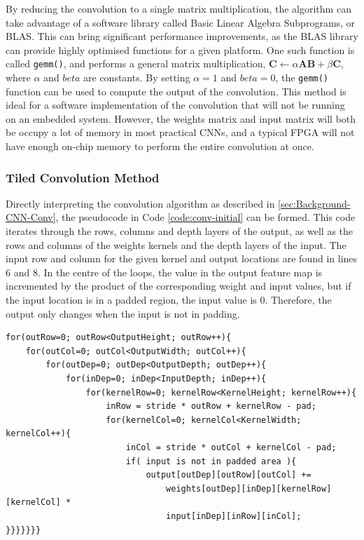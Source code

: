 \documentclass[12pt]{article}
\begin{document}
By reducing the convolution to a single matrix multiplication, the algorithm can take advantage of a software library called Basic Linear Algebra Subprograms, or BLAS. This can bring significant performance improvements, as the BLAS library can provide highly optimised functions for a given platform. One such function is called \lstinline|gemm()|, and performs a general matrix multiplication, $\mathbf{C} \gets \alpha\mathbf{A}\mathbf{B} + \beta\mathbf{C}$, where $\alpha$ and $beta$ are constants. By setting $\alpha = 1$ and $beta = 0$, the \lstinline|gemm()| function can be used to compute the output of the convolution. This method is ideal for a software implementation of the convolution that will not be running on an embedded system. However, the weights matrix and input matrix will both be occupy a lot of memory in most practical CNNs, and a typical FPGA will not have enough on-chip memory to perform the entire convolution at once.

\subsubsection{Tiled Convolution Method}
\label{sec:Imp-Conv-PC}

Directly interpreting the convolution algorithm as described in \ref{sec:Background-CNN-Conv}, the pseudocode in Code \ref{code:conv-initial} can be formed. This code iterates through the rows, columns and depth layers of the output, as well as the rows and columns of the weights kernels and the depth layers of the input. The input row and column for the given kernel and output locations are found in lines 6 and 8. In the centre of the loops, the value in the output feature map is incremented by the product of the corresponding weight and input values, but if the input location is in a padded region, the input value is 0. Therefore, the output only changes when the input is not in padding.

\renewcommand{\lstlistingname}{Code}
\begin{lstlisting}[caption=Basic Convolution, label=code:conv-initial]
for(outRow=0; outRow<OutputHeight; outRow++){
	for(outCol=0; outCol<OutputWidth; outCol++){
		for(outDep=0; outDep<OutputDepth; outDep++){
			for(inDep=0; inDep<InputDepth; inDep++){      
				for(kernelRow=0; kernelRow<KernelHeight; kernelRow++){        
					inRow = stride * outRow + kernelRow - pad;
					for(kernelCol=0; kernelCol<KernelWidth; kernelCol++){          
						inCol = stride * outCol + kernelCol - pad;
						if( input is not in padded area ){
							output[outDep][outRow][outCol] +=
								weights[outDep][inDep][kernelRow][kernelCol] *
								input[inDep][inRow][inCol];
}}}}}}}
\end{lstlisting} 
\end{document}
